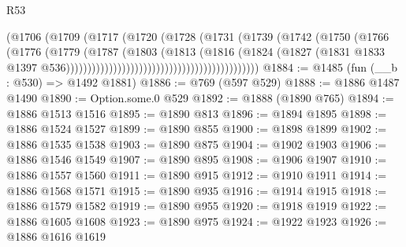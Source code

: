 \begin{lexlean}{R53}
\begin{coremodule}
                                                        (@1706
                                                          (@1709
                                                            (@1717
                                                              (@1720
                                                                (@1728
                                                                  (@1731
                                                                    (@1739
                                                                      (@1742
                                                                        (@1750
                                                                          (@1766
                                                                            (@1776
                                                                              (@1779
                                                                                (@1787
                                                                                  (@1803
                                                                                    (@1813
                                                                                      (@1816
                                                                                        (@1824
                                                                                          (@1827
                                                                                            (@1831
                                                                                              @1833
                                                                                              @1397
                                                                                              @536)))))))))))))))))))))))))))))))))))))))))))))
@1884 := @1485 (fun (__b : @530) => @1492 @1881)
@1886 := @769 (@597 @529)
@1888 := @1886 @1487 @1490
@1890 := Option.some.{0} @529
@1892 := @1888 (@1890 @765)
@1894 := @1886 @1513 @1516
@1895 := @1890 @813
@1896 := @1894 @1895
@1898 := @1886 @1524 @1527
@1899 := @1890 @855
@1900 := @1898 @1899
@1902 := @1886 @1535 @1538
@1903 := @1890 @875
@1904 := @1902 @1903
@1906 := @1886 @1546 @1549
@1907 := @1890 @895
@1908 := @1906 @1907
@1910 := @1886 @1557 @1560
@1911 := @1890 @915
@1912 := @1910 @1911
@1914 := @1886 @1568 @1571
@1915 := @1890 @935
@1916 := @1914 @1915
@1918 := @1886 @1579 @1582
@1919 := @1890 @955
@1920 := @1918 @1919
@1922 := @1886 @1605 @1608
@1923 := @1890 @975
@1924 := @1922 @1923
@1926 := @1886 @1616 @1619

\end{coremodule}
\end{lexlean}
